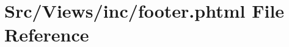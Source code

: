 \hypertarget{footer_8phtml}{}\section{Src/\+Views/inc/footer.phtml File Reference}
\label{footer_8phtml}
